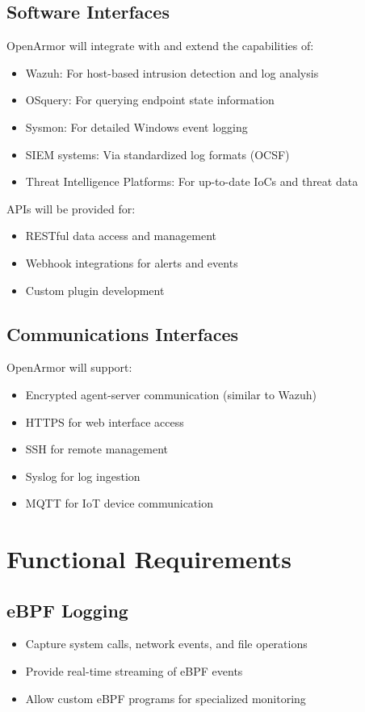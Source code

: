 \subsection{Software Interfaces}
OpenArmor will integrate with and extend the capabilities of:
\begin{itemize}
    \item Wazuh: For host-based intrusion detection and log analysis
    \item OSquery: For querying endpoint state information
    \item Sysmon: For detailed Windows event logging
    \item SIEM systems: Via standardized log formats (OCSF)
    \item Threat Intelligence Platforms: For up-to-date IoCs and threat data
\end{itemize}

APIs will be provided for:
\begin{itemize}
    \item RESTful data access and management
    \item Webhook integrations for alerts and events
    \item Custom plugin development
\end{itemize}

\subsection{Communications Interfaces}
OpenArmor will support:
\begin{itemize}
    \item Encrypted agent-server communication (similar to Wazuh)
    \item HTTPS for web interface access
    \item SSH for remote management
    \item Syslog for log ingestion
    \item MQTT for IoT device communication
\end{itemize}

\section{Functional Requirements}

\subsection{eBPF Logging}
\begin{itemize}
    \item Capture system calls, network events, and file operations
    \item Provide real-time streaming of eBPF events
    \item Allow custom eBPF programs for specialized monitoring
\end{itemize}

